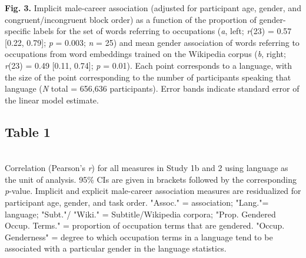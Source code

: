 \documentclass[11pt]{wlscirep}
\begin{document}
{\bf Fig. 3.} Implicit male-career association (adjusted for participant age,
gender, and congruent/incongruent block order) as a function of the proportion of gender-specific labels for the set of words referring to occupations ({\it a}, left; \emph{r}(23) = 0.57 {[}0.22, 0.79{]}; \emph{p} = 0.003; \emph{n} = 25) and  mean gender association of words
referring to occupations from word embeddings trained on the Wikipedia corpus ({\it b}, right; \emph{r}(23) = 0.49 {[}0.11, 0.74{]}; \emph{p} = 0.01). Each point corresponds to a language, with the size of the point corresponding to the number of participants
speaking that language ({\it N} total = 656,636 participants). Error bands indicate standard error of the
linear model estimate.
\subsection*{Table 1}~\\

Correlation (Pearson’s  \emph{r}) for all measures in Study 1b and 2 using language as the unit of analysis. 95\% CIs are given in brackets followed by the corresponding {\it p}-value. Implicit and explicit male-career association measures are residualized for participant age, gender, and task order. "Assoc." = association; "Lang."= language; "Subt."/ "Wiki." = Subtitle/Wikipedia corpora; "Prop. Gendered Occup. Terms." = proportion of occupation terms that are gendered. "Occup. Genderness" = degree to which occupation terms in a language tend to be associated with a particular gender in the language statistics.
\newpage
\newpage





\pagestyle{empty}
\hfill
\tiny
\end{document}
